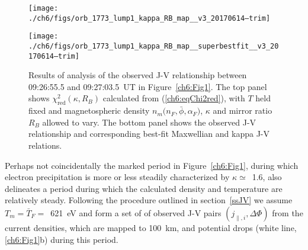 \DIFdelend %

  \begin{figure}
    \centering

    \noindent\texttt{[image: ./ch6/figs/orb\_1773\_lump1\_kappa\_RB\_map\_\_v3\_20170614--trim]}

    \vspace{1cm}

    \noindent\texttt{[image: ./ch6/figs/orb\_1773\_lump1\_kappa\_RB\_map\_\_superbestfit\_\_v3\_20170614--trim]}

    \caption[Orbit 1773: Reduced chi-squared values for observed J-V
    relationship with $T$ held fixed and magnetospheric density
    $n_m \big ( n_F, \bar{\phi}, \alpha_F \big )$ $\kappa$ and $R_B$ allowed to
    vary, and corresponding best-fit J-V curves.]{Results of analysis of the
      observed J-V relationship between 09:26:55.5 and 09:27:03.5~UT in
      Figure~\ref{ch6:Fig1}. The top panel shows
      $\chi^2_{\mathrm{red}} ( \kappa, R_B)$ calculated from
      (\ref{ch6:eqChi2red}), with $T$ held fixed and magnetospheric density
      $n_m \big ( n_F, \bar{\phi}, \alpha_F \big )$, $\kappa$ and mirror ratio
      $R_B$ allowed to vary. The bottom panel shows the observed J-V
      relationship and corresponding best-fit Maxwellian and kappa J-V
      relations.}
    \label{ch6:Fig3}
  \end{figure}


  Perhaps not coincidentally the marked period in Figure~\ref{ch6:Fig1}, during
  which electron precipitation is more or less steadily characterized by
  $\kappa \simeq$~1.6, also delineates a period during which the calculated
  density and temperature are relatively steady. Following the procedure
  outlined in section~\ref{ssJV} we assume $T_m = \bar{T}_F =$~621~eV and form a
  set of of observed J-V pairs $( j_{\parallel,i} , \Delta \Phi )$ from the
  current densities, which are mapped to 100~km, and potential drops (white
  \DIFaddbegin {}\DIFaddend line, \ref{ch6:Fig1}b) during this period.

